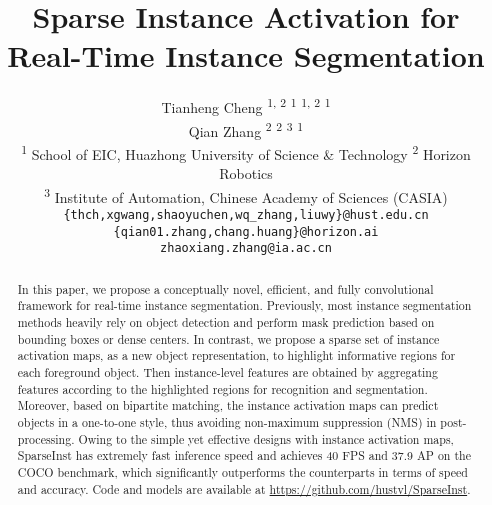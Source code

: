 \documentclass[10pt,twocolumn,letterpaper]{article}
\begin{document}
\title{Sparse Instance Activation for Real-Time Instance Segmentation}





\author{
{Tianheng Cheng} \textsuperscript{1, 2}  \textsuperscript{1}  \textsuperscript{1, 2}  \textsuperscript{1} \\
{Qian Zhang} \textsuperscript{2}  \textsuperscript{2}  \textsuperscript{3}  \textsuperscript{1}
\\
\textsuperscript{1} School of EIC, Huazhong University of Science \& Technology \quad \textsuperscript{2} Horizon Robotics \\
\textsuperscript{3} Institute of Automation, Chinese Academy of Sciences (CASIA) \\
{\tt\small \{thch,xgwang,shaoyuchen,wq\_zhang,liuwy\}@hust.edu.cn \quad \{qian01.zhang,chang.huang\}@horizon.ai} \\ 
{\tt\small zhaoxiang.zhang@ia.ac.cn}}

\maketitle

\begin{abstract}
In this paper, we propose a conceptually novel, efficient, and fully convolutional framework for real-time instance segmentation. Previously, most instance segmentation methods heavily rely on object detection and perform mask prediction based on bounding boxes or dense centers. In contrast, we propose a sparse set of instance activation maps, as a new object representation, to highlight informative regions for each foreground object. Then instance-level features are obtained by aggregating features according to the highlighted regions for recognition and segmentation. Moreover, based on bipartite matching, the instance activation maps can predict objects in a one-to-one style, thus avoiding non-maximum suppression (NMS) in post-processing. Owing to the simple yet effective designs with instance activation maps, SparseInst has extremely fast inference speed and achieves 40 FPS and 37.9 AP on the COCO benchmark, which significantly outperforms the counterparts in terms of speed and accuracy. Code and models
are available at \url{https://github.com/hustvl/SparseInst}.

\end{abstract}
\end{document}
